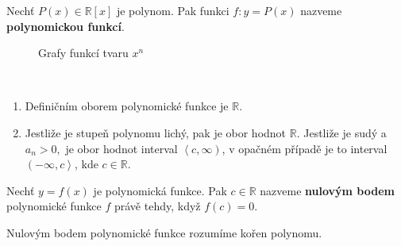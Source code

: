 \begin{definition}
    Nechť $P(x)\in \mathbb R[x]$ je polynom. Pak funkci $f:y=P(x)$ nazveme \textbf{polynomickou funkcí}.
\end{definition}

\begin{figure}[ht!]
  \centering
  \caption{Grafy funkcí tvaru $x^n$}
\end{figure}

\begin{pozn}\,
    \begin{enumerate}[$i.$]
        \item Definičním oborem polynomické funkce je $\mathbb R.$
        \item Jestliže je stupeň polynomu lichý, pak je obor hodnot $\mathbb R.$ Jestliže je sudý a $a_n > 0,$ je obor hodnot interval $\left <c,\infty \right )$,
        v opačném případě je to interval $\left (-\infty, c\right >$, kde $c \in \mathbb R$.
    \end{enumerate}
\end{pozn}

\begin{definition}
    Nechť $y=f(x)$ je polynomická funkce. Pak $c\in \mathbb R$ nazveme \textbf{nulovým bodem} polynomické funkce $f$ právě tehdy, když $f(c)=0.$
\end{definition}

\begin{pozn}
    Nulovým bodem polynomické funkce rozumíme kořen polynomu.
\end{pozn}
